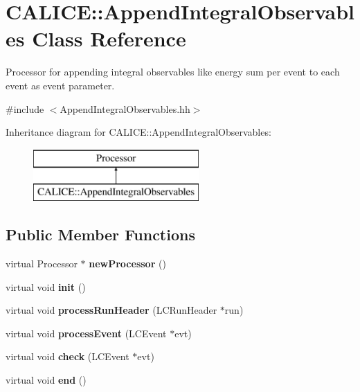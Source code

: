 \section{C\-A\-L\-I\-C\-E\-:\-:Append\-Integral\-Observables Class Reference}
\label{classCALICE_1_1AppendIntegralObservables}


Processor for appending integral observables like energy sum per event to each event as event parameter.  




{\ttfamily \#include $<$Append\-Integral\-Observables.\-hh$>$}

Inheritance diagram for C\-A\-L\-I\-C\-E\-:\-:Append\-Integral\-Observables\-:\begin{figure}[H]
\begin{center}
\leavevmode
\includegraphics[height=2.000000cm]{classCALICE_1_1AppendIntegralObservables}
\end{center}
\end{figure}
\subsection*{Public Member Functions}
\begin{DoxyCompactItemize}
\item 
virtual Processor $\ast$ {\bfseries new\-Processor} ()\label{classCALICE_1_1AppendIntegralObservables_ae4e5bf5b6b635918b71198dfdcc2de41}

\item 
virtual void {\bf init} ()
\item 
virtual void {\bf process\-Run\-Header} (L\-C\-Run\-Header $\ast$run)
\item 
virtual void {\bf process\-Event} (L\-C\-Event $\ast$evt)
\item 
virtual void {\bfseries check} (L\-C\-Event $\ast$evt)\label{classCALICE_1_1AppendIntegralObservables_a6a616ca3848eefb2008f64ad2533725d}

\item 
virtual void {\bf end} ()
\end{DoxyCompactItemize}
